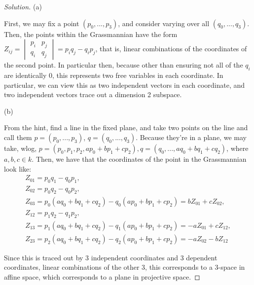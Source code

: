 \documentclass[10pt]{article}
\begin{document}
\begin{proof}[Solution]

(a)

First, we may fix a point $(p_0,...,p_3)$, and consider varying over all $(q_0,...,q_3)$. Then, the points within the Grassmannian have the form $Z_{ij} =\begin{vmatrix} p_i & p_j \\  q_i & q_j \end{vmatrix} = p_iq_j - q_ip_j$, that is, linear combinations of the coordinates of the second point. In particular then, because other than ensuring not all of the $q_i$ are identically 0, this represents two free variables in each coordinate. In particular, we can view this as two independent vectors in each coordinate, and two independent vectors trace out a dimension 2 subspace.

(b)

From the hint, find a line in the fixed plane, and take two points on the line and call them $p = (p_0,...,p_3)$,  $q = (q_0,...,q_3)$. Because they're in a plane, we may take, wlog, $p = (p_0,p_1,p_2, ap_0 + bp_1 + cp_2), q =  (q_0,...,aq_0 + bq_1 + cq_2)$, where $a,b,c \in k$. Then, we have that the coordinates of the point in the Grassmannian look like:
\begin{gather}
Z_{01} = p_0q_1 - q_0 p_1, \\ Z_{02} = p_0q_2 - q_0 p_2, \\Z_{03} = p_0(aq_0 + bq_1 + cq_2) - q_0(ap_0 + bp_1 + cp_2) = bZ_{01} + cZ_{02}, \\Z_{12} = p_1q_2 - q_1 p_2, \\Z_{13} = p_1(aq_0 + bq_1 + cq_2) - q_1(ap_0 + bp_1 + cp_2) = -aZ_{01} + cZ_{12}, \\ Z_{23} = p_2(aq_0 + bq_1 + cq_2)- q_2 (ap_0 + bp_1 + cp_2) = -aZ_{02} - bZ_{12}
\end{gather}

Since this is traced out by 3 independent coordinates and 3 dependent coordinates, linear combinations of the other 3, this corresponds to a 3-space in affine space, which corresponds to a plane in projective space.

\end{proof}
\end{document}

